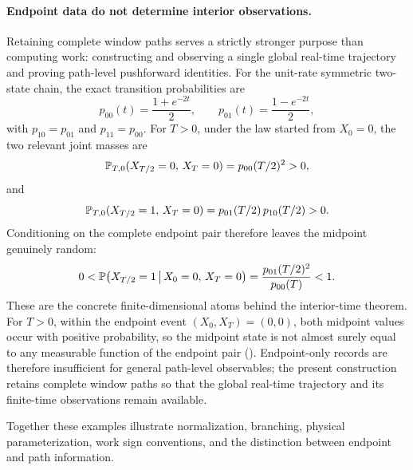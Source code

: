 \paragraph{Endpoint data do not determine interior observations.}
Retaining complete window paths serves a strictly stronger purpose than computing work: constructing and observing a single global real-time trajectory and proving path-level pushforward identities. For the unit-rate symmetric two-state chain, the exact transition probabilities are
\[
  p_{00}(t)=\frac{1+e^{-2t}}{2},
  \qquad
  p_{01}(t)=\frac{1-e^{-2t}}{2},
\]
with $p_{10}=p_{01}$ and $p_{11}=p_{00}$. For $T>0$, under the law started from $X_0=0$, the two relevant joint masses are
\[
  \mathbb{P}_{T,0}(X_{T/2}=0,\,X_T=0)
  =p_{00}(T/2)^2>0,
\]
and
\[
  \mathbb{P}_{T,0}(X_{T/2}=1,\,X_T=0)
  =p_{01}(T/2)\,p_{10}(T/2)>0.
\]
Conditioning on the complete endpoint pair therefore leaves the midpoint genuinely random:
\[
  0<
  \mathbb{P}\bigl(X_{T/2}=1\,\big|\,X_0=0,\,X_T=0\bigr)
  =\frac{p_{01}(T/2)^2}{p_{00}(T)}
  <1 .
\]
These are the concrete finite-dimensional atoms behind the interior-time theorem. For $T>0$, within the endpoint event $(X_0,X_T)=(0,0)$, both midpoint values occur with positive probability, so the midpoint state is not almost surely equal to any measurable function of the endpoint pair (). Endpoint-only records are therefore insufficient for general path-level observables; the present construction retains complete window paths so that the global real-time trajectory and its finite-time observations remain available.

Together these examples illustrate normalization, branching, physical parameterization, work sign conventions, and the distinction between endpoint and path information.
